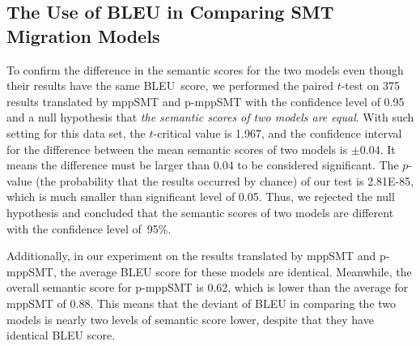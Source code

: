 \subsection{The Use of BLEU in Comparing SMT Migration Models}

To confirm the difference in the semantic scores for the two
models even though their results have the same BLEU~score, we performed the
paired $t$-test\cite{geek_2015} on 375 results translated by mppSMT and
p-mppSMT with the confidence level of
0.95 and a null hypothesis that {\em the semantic scores of two models
are equal}. With such setting for this data set, the $t$-critical value is 1.967,
and the confidence interval for the difference between the mean semantic scores
of two models is $\pm0.04$. It means the difference must be larger than 0.04 to
be considered significant. The $p$-value (the probability
that the results occurred by chance) of our test is 2.81E-85, which is much
smaller than significant level of 0.05. Thus, we rejected the null hypothesis and concluded
that the semantic scores of two models are different with the confidence
level of~95\%.

Additionally, in our experiment on the results translated by mppSMT
and p-mppSMT, the average BLEU score for these models are
identical. Meanwhile, the overall semantic score for p-mppSMT is 0.62,
which is lower than the average for mppSMT of 0.88. This means that
the deviant of BLEU in comparing the two models is nearly two
levels of semantic score lower, despite that they have identical BLEU
score.



